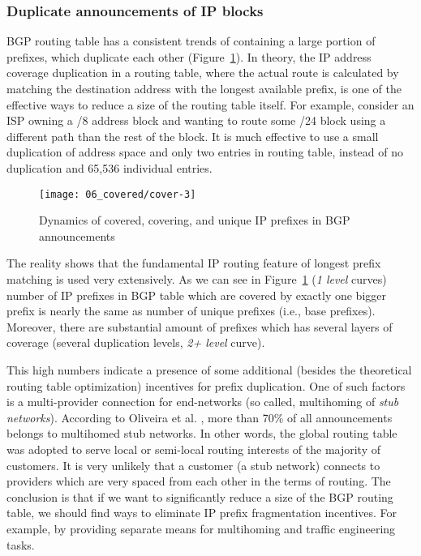 \subsubsection{Duplicate announcements of IP blocks}

BGP routing table has a consistent trends of containing a large portion of
prefixes, which duplicate each other (Figure~\ref{fig:covered}). In theory,
the IP address coverage duplication in a routing table, where the actual route
is calculated by matching the destination address with the longest available
prefix, is one of the effective ways to reduce a size of the routing table
itself. For example, consider an ISP owning a /8 address block and wanting to
route some /24 block using a different path than the rest of the block. It is
much effective to use a small duplication of address space and only two
entries in routing table, instead of no duplication and 65,536 individual
entries.

\begin{figure}[htbp]
	\centering
		\texttt{[image: 06\_covered/cover-3]}
	\caption{Dynamics of covered, covering, and unique IP prefixes in BGP announcements}
	\label{fig:covered}
\end{figure}

The reality shows that the fundamental IP routing feature of longest prefix
matching is used very extensively. As we can see in Figure~\ref{fig:covered}
(\emph{1 level} curves) number of IP prefixes in BGP table which are covered
by exactly one bigger prefix is nearly the same as number of unique prefixes
(i.e., base prefixes). Moreover, there are substantial amount of prefixes
which has several layers of coverage (several duplication levels, \emph{2+
level} curve).

This high numbers indicate a presence of some additional (besides the
theoretical routing table optimization) incentives for prefix duplication. One
of such factors is a multi-provider connection for end-networks (so called,
multihoming of \emph{stub networks}). According to Oliveira et al.
\cite{Oliveira:2007:Observing-the-evolution}, more than 70\% of all
announcements belongs to multihomed stub networks. In other words, the global
routing table was adopted to serve local or semi-local routing interests of
the majority of customers. It is very unlikely that a customer (a stub
network) connects to providers which are very spaced from each other in the
terms of routing. The conclusion is that if we want to significantly reduce a
size of the BGP routing table, we should find ways to eliminate IP prefix
fragmentation incentives. For example, by providing separate means for
multihoming and traffic engineering tasks.

